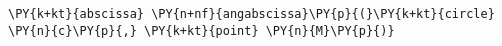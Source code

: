 \begin{Verbatim}[commandchars=\\\{\}]
      \PY{k+kt}{abscissa} \PY{n+nf}{angabscissa}\PY{p}{(}\PY{k+kt}{circle} \PY{n}{c}\PY{p}{,} \PY{k+kt}{point} \PY{n}{M}\PY{p}{)}
\end{Verbatim}
